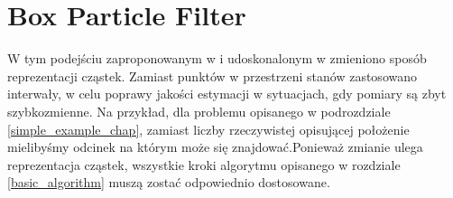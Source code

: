 \section{Box Particle Filter}
W tym podejściu zaproponowanym w \cite{bpf_base} i udoskonalonym w \cite{brbpf} zmieniono sposób reprezentacji cząstek. Zamiast punktów w przestrzeni stanów zastosowano interwały, w celu poprawy jakości estymacji w sytuacjach, gdy pomiary są zbyt szybkozmienne. Na przykład, dla problemu opisanego w podrozdziale \ref{simple_example_chap}, zamiast liczby rzeczywistej opisującej położenie mielibyśmy odcinek na którym może się znajdować.Ponieważ zmianie ulega reprezentacja cząstek, wszystkie kroki algorytmu opisanego w rozdziale \ref{basic_algorithm} muszą zostać odpowiednio dostosowane.

